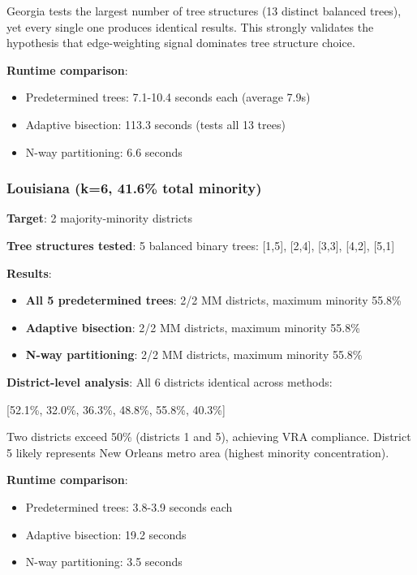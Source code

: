 Georgia tests the largest number of tree structures (13 distinct balanced trees), yet every single one produces identical results. This strongly validates the hypothesis that edge-weighting signal dominates tree structure choice.

\textbf{Runtime comparison}:
\begin{itemize}
\item Predetermined trees: 7.1-10.4 seconds each (average 7.9s)
\item Adaptive bisection: 113.3 seconds (tests all 13 trees)
\item N-way partitioning: 6.6 seconds
\end{itemize}

\subsubsection{Louisiana (k=6, 41.6\% total minority)}

\textbf{Target}: 2 majority-minority districts

\textbf{Tree structures tested}: 5 balanced binary trees: [1,5], [2,4], [3,3], [4,2], [5,1]

\textbf{Results}:
\begin{itemize}
\item \textbf{All 5 predetermined trees}: 2/2 MM districts, maximum minority 55.8\%
\item \textbf{Adaptive bisection}: 2/2 MM districts, maximum minority 55.8\%
\item \textbf{N-way partitioning}: 2/2 MM districts, maximum minority 55.8\%
\end{itemize}

\textbf{District-level analysis}: All 6 districts identical across methods:
\begin{center}
[52.1\%, 32.0\%, 36.3\%, 48.8\%, 55.8\%, 40.3\%]
\end{center}

Two districts exceed 50\% (districts 1 and 5), achieving VRA compliance. District 5 likely represents New Orleans metro area (highest minority concentration).

\textbf{Runtime comparison}:
\begin{itemize}
\item Predetermined trees: 3.8-3.9 seconds each
\item Adaptive bisection: 19.2 seconds
\item N-way partitioning: 3.5 seconds
\end{itemize}

